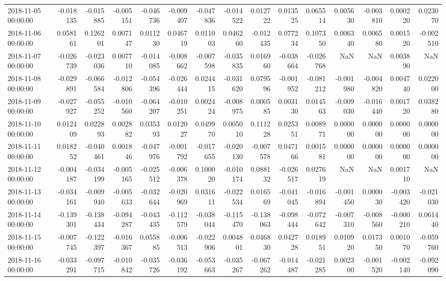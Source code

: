 \begin{tabular}{lrrrrrrrrrrrrrr}
2018-11-05 00:00:00 & -0.018135 & -0.015885 & -0.005151 & -0.046736 & -0.009407 & -0.047836 & -0.014522 & 0.012722 & 0.013525 & 0.065514 & 0.005630 & -0.003810 & 0.000220 & 0.023070 \\
2018-11-06 00:00:00 & 0.058161 & 0.126201 & 0.007147 & 0.011230 & 0.046719 & 0.011003 & 0.046260 & -0.012435 & 0.077234 & 0.107350 & 0.006340 & 0.006580 & 0.001520 & -0.002510 \\
2018-11-07 00:00:00 & -0.026739 & -0.023036 & 0.007710 & -0.014085 & -0.008662 & -0.007598 & -0.035835 & 0.016960 & -0.038664 & -0.026768 & NaN & NaN & 0.003890 & NaN \\
2018-11-08 00:00:00 & -0.029891 & -0.066584 & -0.012806 & -0.054396 & -0.026444 & 0.024415 & -0.031620 & 0.079596 & -0.001952 & -0.081212 & -0.001980 & -0.004820 & 0.004740 & 0.022000 \\
2018-11-09 00:00:00 & -0.027927 & -0.055252 & -0.010560 & -0.064207 & -0.010251 & 0.002424 & -0.008975 & 0.000585 & 0.003130 & 0.014563 & -0.009030 & -0.016440 & 0.001720 & 0.038280 \\
2018-11-10 00:00:00 & 0.012409 & 0.022893 & 0.002882 & 0.035393 & 0.012027 & 0.049970 & 0.005010 & 0.111228 & 0.025351 & 0.008971 & 0.000000 & 0.000000 & 0.000000 & 0.000000 \\
2018-11-11 00:00:00 & 0.018252 & -0.040461 & 0.001846 & -0.047976 & -0.001792 & -0.017655 & -0.020130 & -0.007578 & 0.047166 & 0.001581 & 0.000000 & 0.000000 & 0.000000 & 0.000000 \\
2018-11-12 00:00:00 & -0.004187 & -0.034199 & -0.005165 & -0.025512 & -0.006378 & 0.100020 & -0.010174 & 0.088132 & -0.026517 & 0.027619 & NaN & NaN & 0.001710 & NaN \\
2018-11-13 00:00:00 & -0.034161 & -0.009940 & -0.005633 & -0.032644 & -0.020969 & 0.031611 & -0.022534 & 0.016569 & -0.041045 & -0.016894 & -0.001450 & 0.000030 & -0.003420 & -0.021030 \\
2018-11-14 00:00:00 & -0.139301 & -0.138434 & -0.094287 & -0.043435 & -0.112579 & -0.038044 & -0.115470 & -0.138063 & -0.098444 & -0.072642 & -0.007310 & -0.008560 & -0.000210 & 0.061440 \\
2018-11-15 00:00:00 & -0.007745 & -0.122397 & -0.016367 & 0.055885 & -0.006513 & -0.022906 & 0.004801 & 0.046830 & 0.042728 & 0.018951 & 0.010920 & 0.017350 & 0.001070 & -0.059760 \\
2018-11-16 00:00:00 & -0.033291 & -0.097715 & -0.010842 & -0.035726 & -0.036192 & -0.053663 & -0.035267 & -0.067262 & -0.014487 & -0.021285 & 0.002300 & -0.001520 & -0.002140 & -0.092090 \\

\end{tabular}
